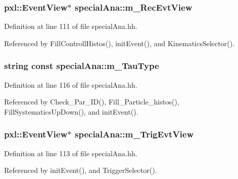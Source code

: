 \subsubsection[{m\-\_\-\-Rec\-Evt\-View}]{\setlength{\rightskip}{0pt plus 5cm}pxl\-::\-Event\-View$\ast$ special\-Ana\-::m\-\_\-\-Rec\-Evt\-View}\label{classspecialAna_a7544fa663090f43e35ff6c8594884c37}


Definition at line 111 of file special\-Ana.\-hh.



Referenced by Fill\-Controll\-Histos(), init\-Event(), and Kinematics\-Selector().

\subsubsection[{m\-\_\-\-Tau\-Type}]{\setlength{\rightskip}{0pt plus 5cm}string const special\-Ana\-::m\-\_\-\-Tau\-Type}\label{classspecialAna_a928cc6c577c7d2a9df708f038c7b7b2f}


Definition at line 116 of file special\-Ana.\-hh.



Referenced by Check\-\_\-\-Par\-\_\-\-I\-D(), Fill\-\_\-\-Particle\-\_\-histos(), Fill\-Systematics\-Up\-Down(), and init\-Event().

\subsubsection[{m\-\_\-\-Trig\-Evt\-View}]{\setlength{\rightskip}{0pt plus 5cm}pxl\-::\-Event\-View$\ast$ special\-Ana\-::m\-\_\-\-Trig\-Evt\-View}\label{classspecialAna_aaacff41e1aa1c73726d348ead1319c2e}


Definition at line 113 of file special\-Ana.\-hh.



Referenced by init\-Event(), and Trigger\-Selector().

